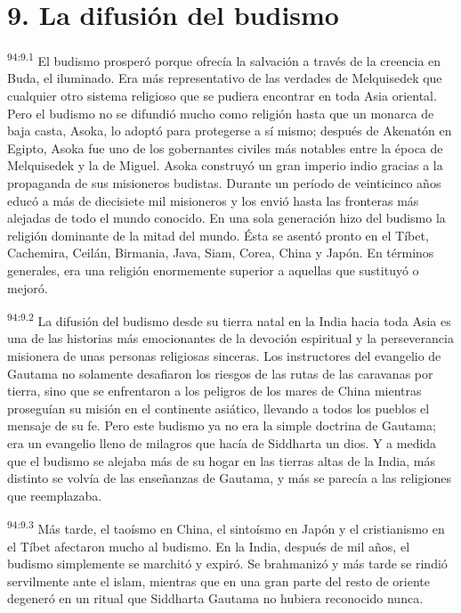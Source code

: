 \section*{9. La difusión del budismo}
\par
\textsuperscript{94:9.1} El budismo prosperó porque ofrecía la salvación a través de la creencia en Buda, el iluminado. Era más representativo de las verdades de Melquisedek que cualquier otro sistema religioso que se pudiera encontrar en toda Asia oriental. Pero el budismo no se difundió mucho como religión hasta que un monarca de baja casta, Asoka, lo adoptó para protegerse a sí mismo; después de Akenatón en Egipto, Asoka fue uno de los gobernantes civiles más notables entre la época de Melquisedek y la de Miguel. Asoka construyó un gran imperio indio gracias a la propaganda de sus misioneros budistas. Durante un período de veinticinco años educó a más de diecisiete mil misioneros y los envió hasta las fronteras más alejadas de todo el mundo conocido. En una sola generación hizo del budismo la religión dominante de la mitad del mundo. Ésta se asentó pronto en el Tíbet, Cachemira, Ceilán, Birmania, Java, Siam, Corea, China y Japón. En términos generales, era una religión enormemente superior a aquellas que sustituyó o mejoró.

\par
\textsuperscript{94:9.2} La difusión del budismo desde su tierra natal en la India hacia toda Asia es una de las historias más emocionantes de la devoción espiritual y la perseverancia misionera de unas personas religiosas sinceras. Los instructores del evangelio de Gautama no solamente desafiaron los riesgos de las rutas de las caravanas por tierra, sino que se enfrentaron a los peligros de los mares de China mientras proseguían su misión en el continente asiático, llevando a todos los pueblos el mensaje de su fe. Pero este budismo ya no era la simple doctrina de Gautama; era un evangelio lleno de milagros que hacía de Siddharta un dios. Y a medida que el budismo se alejaba más de su hogar en las tierras altas de la India, más distinto se volvía de las enseñanzas de Gautama, y más se parecía a las religiones que reemplazaba.

\par
\textsuperscript{94:9.3} Más tarde, el taoísmo en China, el sintoísmo en Japón y el cristianismo en el Tíbet afectaron mucho al budismo. En la India, después de mil años, el budismo simplemente se marchitó y expiró. Se brahmanizó y más tarde se rindió servilmente ante el islam, mientras que en una gran parte del resto de oriente degeneró en un ritual que Siddharta Gautama no hubiera reconocido nunca.

